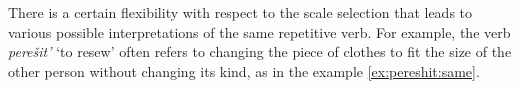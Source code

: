 %
%
%

There is a certain flexibility with respect to the scale selection that leads to various possible interpretations of the same repetitive verb. For example, the verb \textit{pere\v{s}it'} `to resew' often refers to changing the piece of clothes to fit the size of the other person without changing its kind, as in the example \ref{ex:pereshit:same}.

